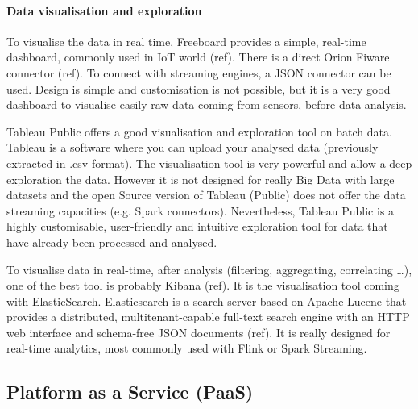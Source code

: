 \paragraph{Data visualisation and exploration}

To visualise the data in real time, Freeboard provides a simple, real-time dashboard, commonly used in IoT world (ref).
There is a direct Orion Fiware connector (ref).
To connect with streaming engines, a JSON connector can be used.
Design is simple and customisation is not possible, but it is a very good dashboard to visualise easily raw data coming from sensors, before data analysis.

Tableau Public offers a good visualisation and exploration tool on batch data.
Tableau is a software where you can upload your analysed data (previously extracted in .csv format).
The visualisation tool is very powerful and allow a deep exploration the data.
However it is not designed for really Big Data with large datasets and the open Source version of Tableau (Public) does not offer the data streaming capacities (e.g. Spark connectors).
Nevertheless, Tableau Public is a highly customisable, user-friendly and intuitive exploration tool for data that have already been processed and analysed.

To visualise data in real-time, after analysis (filtering, aggregating, correlating …), one of the best tool is probably Kibana (ref).
It is the visualisation tool coming with ElasticSearch.
Elasticsearch is a search server based on Apache Lucene that provides a distributed, multitenant-capable full-text search engine with an HTTP web interface and schema-free JSON documents (ref).
It is really designed for real-time analytics, most commonly used with Flink or Spark Streaming.

\subsection{Platform as a Service (PaaS)}


